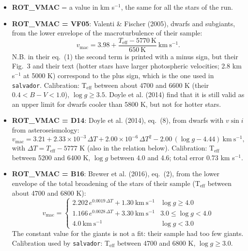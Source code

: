 \documentclass[modern]{aastex701}
\begin{document}
\begin{itemize}
    \item {\bf ROT\_VMAC} = a value in km s$^{-1}$, the same for all the stars of the run.
    \item {\bf ROT\_VMAC = VF05}: Valenti \& Fischer (2005), dwarfs and subgiants, from the lower envelope of the macroturbulence of their sample:
    \begin{equation}
        v_{\mathrm{mac}} = 3.98 + \frac{T_{\mathrm{eff}} - 5770~\mathrm{K}}{650~\mathrm{K}}~\mathrm{km~s^{-1}}.
    \end{equation}
    N.B. in their eq.~(1) the second term is printed with a minus sign, but their Fig.~3 and their text (hotter stars have larger photospheric velocities; 2.8 km s$^{-1}$ at 5000 K) correspond to the plus sign, which is the one used in \texttt{salvador}. Calibration: T$_{\mathrm{eff}}$ between about 4700 and 6600 K (their $0.4 < B-V < 1.0$), $\log g \geq 3.5$. Doyle et al. (2014) find that it is still valid as an upper limit for dwarfs cooler than 5800 K, but not for hotter stars.
    \item {\bf ROT\_VMAC = D14}: Doyle et al. (2014), eq.~(8), from dwarfs with $v \sin i$ from asteroseismology:
    \begin{equation}
        v_{\mathrm{mac}} = 3.21 + 2.33 \times 10^{-3}\, \Delta T + 2.00 \times 10^{-6}\, \Delta T^2 - 2.00\, (\log g - 4.44)~\mathrm{km~s^{-1}},
    \end{equation}
    with $\Delta T = T_{\mathrm{eff}} - 5777$ K (also in the relation below). Calibration: T$_{\mathrm{eff}}$ between 5200 and 6400 K, $\log g$ between 4.0 and 4.6; total error 0.73 km s$^{-1}$.
    \item {\bf ROT\_VMAC = B16}: Brewer et al. (2016), eq.~(2), from the lower envelope of the total broadening of the stars of their sample (T$_{\mathrm{eff}}$ between about 4700 and 6800 K):
    \begin{equation}
        v_{\mathrm{mac}} = \begin{cases}
            2.202\, e^{0.0019\, \Delta T} + 1.30~\mathrm{km~s^{-1}} & \log g \geq 4.0 \\
            1.166\, e^{0.0028\, \Delta T} + 3.30~\mathrm{km~s^{-1}} & 3.0 \leq \log g < 4.0 \\
            4.0~\mathrm{km~s^{-1}} & \log g < 3.0
        \end{cases}
    \end{equation}
    The constant value for the giants is not a fit: their sample had too few giants. Calibration used by \texttt{salvador}: T$_{\mathrm{eff}}$ between 4700 and 6800 K, $\log g \geq 3.0$.

\end{itemize}
\end{document}
